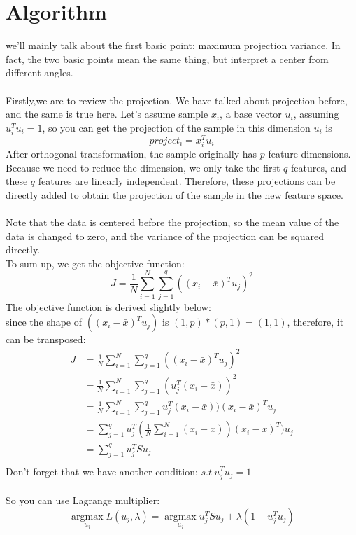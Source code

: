 \documentclass{report}
\begin{document}
\section{Algorithm}
we'll mainly talk about the first basic point: maximum projection variance. In fact, the two basic points mean the same thing, but interpret a center from different angles.\\\\
Firstly,we are to review the projection. We have talked about projection before, and the same is true here. Let's assume sample $x_ i $, a base vector $u_ i $, assuming $u_ i^Tu_ i = 1 $, so you can get the projection of the sample in  this dimension $u_ i $ is
$$
project_i=x_i^Tu_i
$$
After orthogonal transformation, the sample originally has $p $ feature dimensions. Because we need to reduce the dimension, we only take the first $q $ features, and these $q $ features are linearly independent. Therefore, these projections can be directly added to obtain the projection of the sample in the new feature space.\\\\
Note that the data is centered before the projection, so the mean value of the data is changed to zero, and the variance of the projection can be squared directly.\\
To sum up, we get the objective function:
$$
J=\frac{1}{N} \sum_{i=1}^{N} \sum_{j=1}^{q}\left(\left(x_{i}-\bar{x}\right)^{T} u_{j}\right)^{2}
$$
The objective function is derived slightly below:\\
since the shape of $((x_i-\bar{x})^Tu_j)$ is $(1,p)* (p,1)=(1,1)$, therefore, it can be transposed:
$$
\begin{aligned}
J&=\frac{1}{N} \sum_{i=1}^{N} \sum_{j=1}^{q}\left(\left(x_{i}-\bar{x}\right)^{T} u_{j}\right)^{2}\\
&=\frac{1}{N} \sum_{i=1}^{N} \sum_{j=1}^{q}(u_{j}^T(x_{i}-\bar{x}))^{2}\\
&=\frac{1}{N} \sum_{i=1}^{N} \sum_{j=1}^{q}u_{j}^T(x_{i}-\bar{x}))(x_{i}-\bar{x})^T u_j\\
&=\sum_{j=1}^{q} u_{j}^T(\frac{1}{N} \sum_{i=1}^{N} (x_{i}-\bar{x}))(x_{i}-\bar{x})^T) u_j\\
&=\sum_{j=1}^q u_j^T S u_j\\
\end{aligned}
$$
Don't forget that we have another condition: $s.t\ u_j^T u_j=1$\\\\
So you can use Lagrange multiplier:
$$
\underset{u_{j}}{\operatorname{argmax}} L\left(u_{j}, \lambda\right)=\underset{u_{j}}{\operatorname{argmax}} u_{j}^{T} S u_{j}+\lambda\left(1-u_{j}^{T} u_{j}\right)
$$
\end{document}

